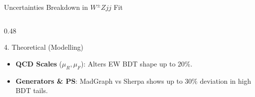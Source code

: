 \documentclass{beamer}
\begin{document}
\begin{frame}[noframenumbering]{Uncertainties Breakdown in $W^\pm Zjj$ Fit}
\begin{columns}[T]
\begin{column}{0.48\textwidth}
            \begin{block}{4. Theoretical (Modelling)}
                \begin{itemize}
                    \item \textbf{QCD Scales} ($\mu_R, \mu_F$): Alters EW BDT shape up to $20\%$.
                    \item \textbf{Generators \& PS}: MadGraph vs Sherpa shows up to $30\%$ deviation in high BDT tails.
                \end{itemize}
            \end{block}
            
        \end{column}
    \end{columns}
\end{frame}
\end{document}
